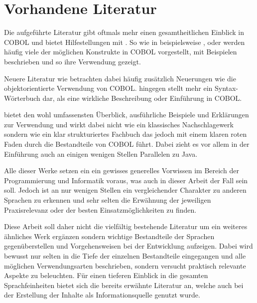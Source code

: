 \section{Vorhandene Literatur}
Die aufgeführte Literatur gibt oftmals mehr einen gesamtheitlichen Einblick in COBOL und bietet Hilfestellungen mit . So wie in beispielsweise ,   oder  werden häufig viele der möglichen Konstrukte in COBOL vorgestellt, mit Beispielen beschrieben und so ihre Verwendung gezeigt. 

Neuere Literatur wie  betrachten dabei häufig zusätzlich Neuerungen wie die objektorientierte Verwendung von COBOL.  
hingegen stellt mehr ein Syntax-Wörterbuch dar, als eine wirkliche Beschreibung oder Einführung in COBOL.

 bietet den wohl umfassensten Überblick, ausführliche Beispiele und Erklärungen zur Verwendung und wirkt dabei nicht wie ein klassisches Nachschlagewerk sondern wie ein klar strukturiertes Fachbuch das jedoch mit einem klaren roten Faden durch die Bestandteile von COBOL führt. Dabei zieht es vor allem in der Einführung auch an einigen wenigen Stellen Parallelen zu Java. 

Alle dieser Werke setzen ein ein gewisses generelles Vorwissen im Bereich der Programmierung und Informatik voraus, was auch in dieser Arbeit der Fall sein soll. Jedoch ist an nur wenigen Stellen ein vergleichender Charakter zu anderen Sprachen zu erkennen und sehr selten die Erwähnung der jeweiligen Praxisrelevanz oder der besten Einsatzmöglichkeiten zu finden. 

Diese Arbeit soll daher nicht die vielfältig bestehende Literatur um ein weiteres ähnliches Werk ergänzen sondern wichtige Bestandteile der Sprachen gegenüberstellen und Vorgehensweisen bei der Entwicklung aufzeigen. Dabei wird bewusst nur selten in die Tiefe der einzelnen Bestandteile eingegangen und alle möglichen Verwendungsarten beschrieben, sondern versucht praktisch relevante Aspekte zu beleuchten. Für einen tieferen Einblick in die gesamten Sprachfeinheiten bietet sich die bereits erwähnte Literatur an, welche auch bei der Erstellung der Inhalte als Informationsquelle genutzt wurde.
